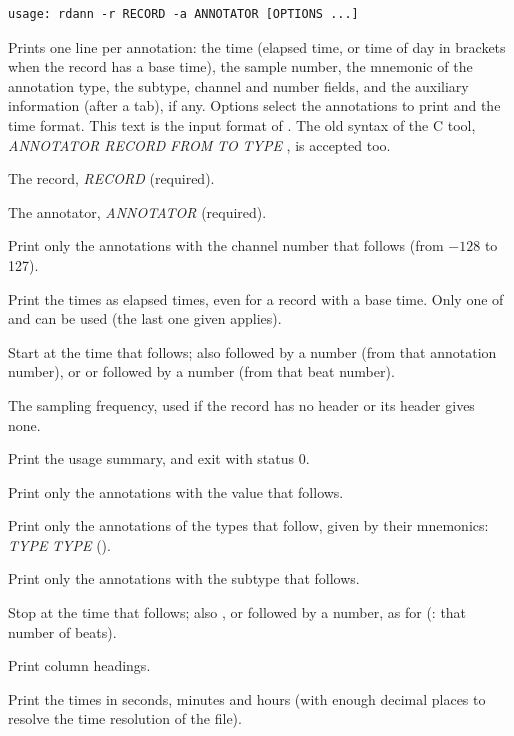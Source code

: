 \begin{lstlisting}[style=signature,language={}]
usage: rdann -r RECORD -a ANNOTATOR [OPTIONS ...]
\end{lstlisting}
Prints one line per annotation: the time (elapsed time, or time of day in brackets when the
record has a base time), the sample number, the mnemonic of the annotation type, the
subtype, channel and number fields, and the auxiliary information (after a tab), if any.
Options select the annotations to print and the time format. This text is the input format
of . The old syntax of the C tool,  \textit{ANNOTATOR RECORD}
\code{[}\textit{FROM} \code{[}\textit{TO} \code{[}\textit{TYPE} \code{...]]]}, is accepted too.
\begin{params}
\item[-r] The record, \textit{RECORD} (required).
\item[-a] The annotator, \textit{ANNOTATOR} (required).
\item[-c] Print only the annotations with the channel number that follows (from $-128$
  to 127).
\item[-e] Print the times as elapsed times, even for a record with a base time. Only one of
   and  can be used (the last one given applies).
\item[-f] Start at the time that follows; also  followed by a number (from that
  annotation number), or  or \code{\#} followed by a number (from that beat number).
\item[-F] The sampling frequency, used if the record has no header or its header gives
  none.
\item[-h] Print the usage summary, and exit with status 0.
\item[-n] Print only the annotations with the  value that follows.
\item[-p] Print only the annotations of the types that follow, given by their mnemonics:
   \textit{TYPE} \code{[}\textit{TYPE} \code{...]} ().
\item[-s] Print only the annotations with the subtype that follows.
\item[-t] Stop at the time that follows; also ,  or \code{\#} followed by a
  number, as for  (\code{\#}: that number of beats).
\item[-v] Print column headings.
\item[-x] Print the times in seconds, minutes and hours (with enough decimal places to
  resolve the time resolution of the file).
\end{params}
